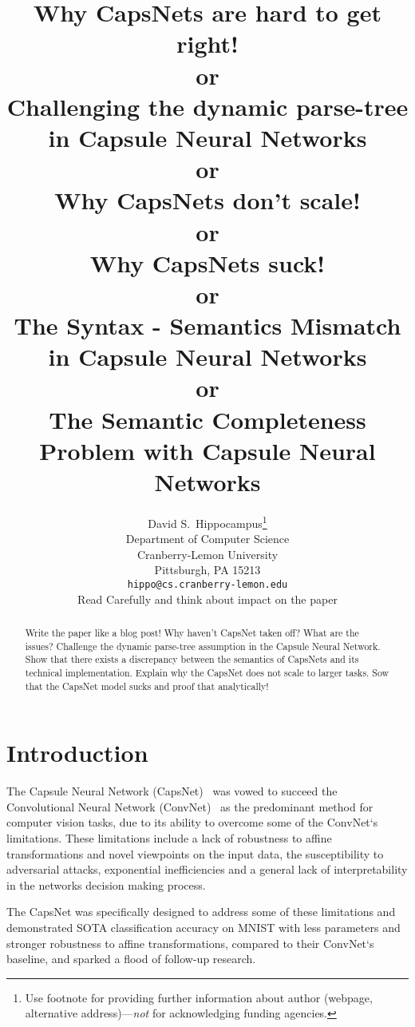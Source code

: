 \documentclass{article}
\title{                                                                                                    \large                                     
	Why CapsNets are hard to get right! \\
	or \\
	Challenging  the dynamic parse-tree in Capsule Neural Networks \\
	or \\
	Why CapsNets don't scale! \\
	or \\
	Why CapsNets suck! \\
	or \\
	The Syntax - Semantics Mismatch in Capsule Neural Networks
	\\
	or \\
	The Semantic Completeness Problem with Capsule Neural Networks
}
\author{%
  David S.~Hippocampus\thanks{Use footnote for providing further information
    about author (webpage, alternative address)---\emph{not} for acknowledging
    funding agencies.} \\
  Department of Computer Science\\
  Cranberry-Lemon University\\
  Pittsburgh, PA 15213 \\
  \texttt{hippo@cs.cranberry-lemon.edu} \\Read Carefully and think about impact on the paper
}
\begin{document}
\maketitle

\begin{abstract}
  Write the paper like a blog post!
  Why haven't CapsNet taken off?
  What are the issues?
  Challenge the dynamic parse-tree assumption in the Capsule Neural Network.
  Show that there exists a discrepancy between the semantics of CapsNets and its technical implementation.
  Explain why the CapsNet does not scale to larger tasks.
  Sow that the CapsNet model sucks and proof that analytically!
\end{abstract}

\begin{comment}
	TODO
	- Rework results
	- Reread the CapsNet paper
	- Think about motivation for parse trees, then motivate experiements accordingly
	- Add better less exhaustive introduction
	- Rework related work
	\url{https://en.wikipedia.org/wiki/Completeness_(logic)}
	
	TODO Meta:
	- Argument around Syntax and Semantics like with logical Systems
	- Choose a central argument that builds the core of the overall argumentation line
	- Build everythign else around that argument.
	
	IDEA:
	- Title in parse-tree form
\end{comment}

\section{Introduction}

The Capsule Neural Network (CapsNet)~\cite{nips/SabourFH17} was vowed to succeed the Convolutional Neural Network (ConvNet)~\cite{neco/LeCunBDHHHJ89} as the predominant method for computer vision tasks, due to its ability to overcome some of the ConvNet`s limitations. %
These limitations include
a lack of robustness to affine transformations and novel viewpoints on the input data, 
the susceptibility to adversarial attacks,
exponential inefficiencies
and a general lack of interpretability in the networks decision making process. %

The CapsNet was specifically designed to address some of these limitations and demonstrated SOTA classification accuracy on MNIST with less parameters and stronger robustness to affine transformations, compared to their ConvNet`s baseline, and sparked a flood of follow-up research.
\end{document}
